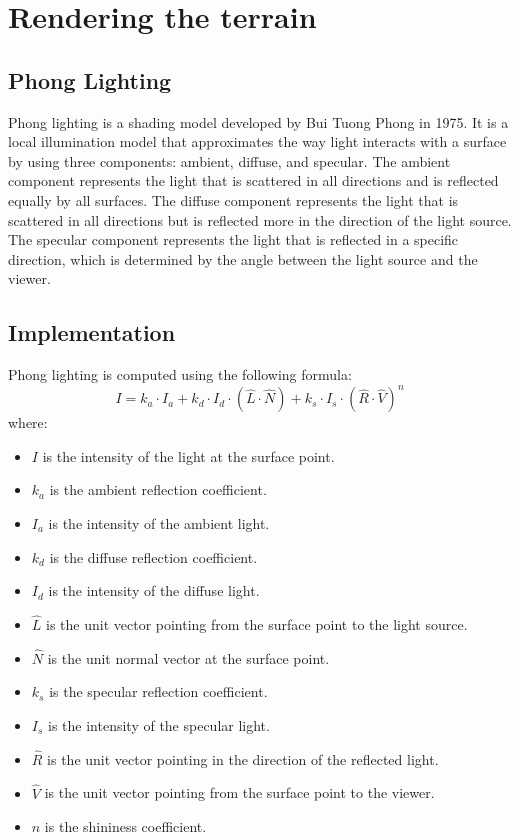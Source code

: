 \documentclass{report}
\begin{document}
\chapter{Rendering the terrain}
\label{ch:rendering-the-terrain}
\section{Phong Lighting}

Phong lighting is a shading model developed by Bui Tuong Phong in 1975. It is a local illumination
model that approximates the way light interacts with a surface by using three components: ambient,
diffuse, and specular. The ambient component represents the light that is scattered in all
directions and is reflected equally by all surfaces. The diffuse component represents the light
that is scattered in all directions but is reflected more in the direction of the light source. The
specular component represents the light that is reflected in a specific direction, which is
determined by the angle between the light source and the viewer.


\section{Implementation}
Phong lighting is computed using the following formula:
$$
I = k_a \cdot I_a + k_d \cdot I_d \cdot (\hat{L} \cdot \hat{N}) + k_s \cdot I_s \cdot (\hat{R} \cdot \hat{V})^n
$$
where:
\begin{itemize}
  \item $I$ is the intensity of the light at the surface point.
  \item $k_a$ is the ambient reflection coefficient.
  \item $I_a$ is the intensity of the ambient light.
  \item $k_d$ is the diffuse reflection coefficient.
  \item $I_d$ is the intensity of the diffuse light.
  \item $\hat{L}$ is the unit vector pointing from the surface point to the light source.
  \item $\hat{N}$ is the unit normal vector at the surface point.
  \item $k_s$ is the specular reflection coefficient.
  \item $I_s$ is the intensity of the specular light.
  \item $\hat{R}$ is the unit vector pointing in the direction of the reflected light.
  \item $\hat{V}$ is the unit vector pointing from the surface point to the viewer.
  \item $n$ is the shininess coefficient.
\end{itemize}
\end{document}
